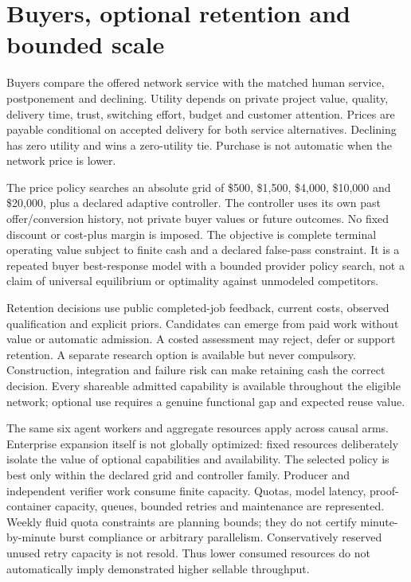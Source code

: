 \documentclass[11pt,letterpaper]{article}
\newcommand{\usd}[1]{\$#1}
\begin{document}
\section{Buyers, optional retention and bounded scale}

Buyers compare the offered network service with the matched human service, postponement and declining. Utility depends on private project value, quality, delivery time, trust, switching effort, budget and customer attention. Prices are payable conditional on accepted delivery for both service alternatives. Declining has zero utility and wins a zero-utility tie. Purchase is not automatic when the network price is lower.

The price policy searches an absolute grid of \usd{500}, \usd{1,500}, \usd{4,000}, \usd{10,000} and \usd{20,000}, plus a declared adaptive controller. The controller uses its own past offer/conversion history, not private buyer values or future outcomes. No fixed discount or cost-plus margin is imposed. The objective is complete terminal operating value subject to finite cash and a declared false-pass constraint. It is a repeated buyer best-response model with a bounded provider policy search, not a claim of universal equilibrium or optimality against unmodeled competitors.

Retention decisions use public completed-job feedback, current costs, observed qualification and explicit priors. Candidates can emerge from paid work without value or automatic admission. A costed assessment may reject, defer or support retention. A separate research option is available but never compulsory. Construction, integration and failure risk can make retaining cash the correct decision. Every shareable admitted capability is available throughout the eligible network; optional use requires a genuine functional gap and expected reuse value.

The same six agent workers and aggregate resources apply across causal arms. Enterprise expansion itself is not globally optimized: fixed resources deliberately isolate the value of optional capabilities and availability. The selected policy is best only within the declared grid and controller family. Producer and independent verifier work consume finite capacity. Quotas, model latency, proof-container capacity, queues, bounded retries and maintenance are represented. Weekly fluid quota constraints are planning bounds; they do not certify minute-by-minute burst compliance or arbitrary parallelism. Conservatively reserved unused retry capacity is not resold. Thus lower consumed resources do not automatically imply demonstrated higher sellable throughput.
\end{document}
